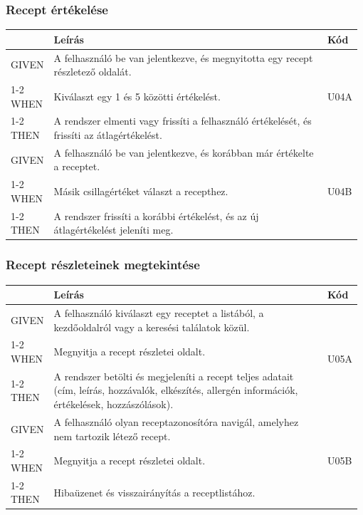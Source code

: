 \subsubsection{Recept értékelése}
\begin{table}[H]
	\centering
	\begin{tabular}{|m{0.12\linewidth}|m{0.78\linewidth}|m{0.08\linewidth}|}
		\hline
		& \textbf{Leírás} & \textbf{Kód} \\\hline
		GIVEN & A felhasználó be van jelentkezve, és megnyitotta egy recept részletező oldalát. & \multirow{3}{*}{U04A} \\\cline{1-2}
		WHEN  & Kiválaszt egy 1 és 5 közötti értékelést. & \\\cline{1-2}
		THEN  & A rendszer elmenti vagy frissíti a felhasználó értékelését, és frissíti az átlagértékelést. & \\\hline

		GIVEN & A felhasználó be van jelentkezve, és korábban már értékelte a receptet. & \multirow{3}{*}{U04B} \\\cline{1-2}
		WHEN  & Másik csillagértéket választ a recepthez. & \\\cline{1-2}
		THEN  & A rendszer frissíti a korábbi értékelést, és az új átlagértékelést jeleníti meg. & \\\hline
	\end{tabular}
\end{table}

\subsubsection{Recept részleteinek megtekintése}
\begin{table}[H]
	\centering
	\begin{tabular}{|m{0.12\linewidth}|m{0.78\linewidth}|m{0.08\linewidth}|}
		\hline
		& \textbf{Leírás} & \textbf{Kód} \\\hline
		GIVEN & A felhasználó kiválaszt egy receptet a listából, a kezdőoldalról vagy a keresési találatok közül. & \multirow{3}{*}{U05A} \\\cline{1-2}
		WHEN  & Megnyitja a recept részletei oldalt. & \\\cline{1-2}
		THEN  & A rendszer betölti és megjeleníti a recept teljes adatait (cím, leírás, hozzávalók, elkészítés, allergén információk, értékelések, hozzászólások). & \\\hline

		GIVEN & A felhasználó olyan receptazonosítóra navigál, amelyhez nem tartozik létező recept. & \multirow{3}{*}{U05B} \\\cline{1-2}
		WHEN  & Megnyitja a recept részletei oldalt. & \\\cline{1-2}
		THEN  & Hibaüzenet és visszairányítás a receptlistához. & \\\hline
	\end{tabular}
\end{table}

